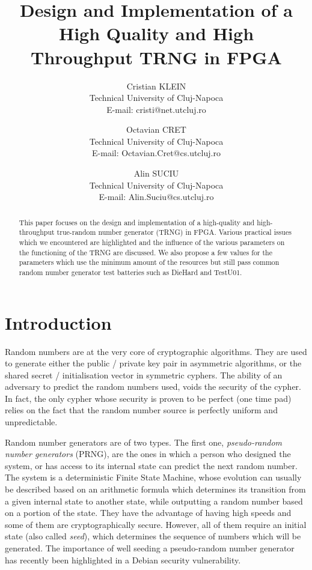 \documentclass[conference]{IEEEtran}
\title{Design and Implementation of a High Quality and High Throughput TRNG in FPGA}
\author{Cristian KLEIN\\
Technical University of Cluj-Napoca\\
E-mail: cristi@net.utcluj.ro
\and
Octavian CRET\\
Technical University of Cluj-Napoca\\
E-mail: Octavian.Cret@cs.utcluj.ro
\and
Alin SUCIU\\
Technical University of Cluj-Napoca\\
E-mail: Alin.Suciu@cs.utcluj.ro
}
\begin{document}
\maketitle
{}

\begin{abstract}
This paper focuses on the design and implementation of a high-quality and high-throughput true-random number generator (TRNG) in FPGA. Various practical issues which we encountered are highlighted and the influence of the various parameters on the functioning of the TRNG are discussed. We also propose a few values for the parameters which use the minimum amount of the resources but still pass common random number generator test batteries such as DieHard and TestU01.
\end{abstract}

\section{Introduction}
Random numbers are at the very core of cryptographic algorithms. They are used to generate either the public / private key pair in asymmetric algorithms, or the shared secret / initialisation vector in symmetric cyphers. The ability of an adversary to predict the random numbers used, voids 
the security of the cypher. In fact, the only cypher whose security is proven to be perfect (one time pad) relies on the fact that the random number source is perfectly uniform and unpredictable.

Random number generators are of two types. The first one, \emph{pseudo-random number generators} (PRNG), are the ones in which a person who designed the system, or has access to its internal state can predict the next random number. The system is a deterministic Finite State Machine, whose evolution can usually be described based on an arithmetic formula which determines its transition from a given internal state to another state, while outputting a random number based on a portion of the state. They have the advantage of having high speeds and some of them are cryptographically secure. However, all of them require an initial state (also called \emph{seed}), which determines the sequence of numbers which will be generated. The importance of well seeding a pseudo-random number generator has recently been highlighted in a Debian security vulnerability\cite{De08}.
\end{document}
